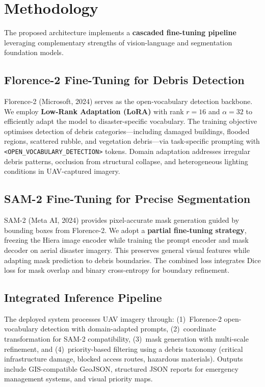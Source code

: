 \documentclass[10pt,a4paper,twocolumn]{article}
\begin{document}
\section{Methodology}

The proposed architecture implements a \textbf{cascaded fine-tuning pipeline}
leveraging complementary strengths of vision-language and segmentation foundation
models.

\subsection{Florence-2 Fine-Tuning for Debris Detection}

Florence-2 (Microsoft, 2024) serves as the open-vocabulary detection backbone.
We employ \textbf{Low-Rank Adaptation (LoRA)} with rank $r{=}16$ and
$\alpha{=}32$ to efficiently adapt the model to disaster-specific vocabulary.
The training objective optimises detection of debris categories---including
damaged buildings, flooded regions, scattered rubble, and vegetation
debris---via task-specific prompting with
\texttt{\small<OPEN\_VOCABULARY\_DETECTION>} tokens.
Domain adaptation addresses irregular debris patterns, occlusion from structural
collapse, and heterogeneous lighting conditions in UAV-captured imagery.

\subsection{SAM-2 Fine-Tuning for Precise Segmentation}

SAM-2 (Meta AI, 2024) provides pixel-accurate mask generation guided by bounding
boxes from Florence-2. We adopt a \textbf{partial fine-tuning strategy}, freezing
the Hiera image encoder while training the prompt encoder and mask decoder on
aerial disaster imagery. This preserves general visual features while adapting
mask prediction to debris boundaries. The combined loss integrates Dice loss for
mask overlap and binary cross-entropy for boundary refinement.

\subsection{Integrated Inference Pipeline}

The deployed system processes UAV imagery through: (1)~Florence-2 open-vocabulary
detection with domain-adapted prompts, (2)~coordinate transformation for SAM-2
compatibility, (3)~mask generation with multi-scale refinement, and (4)~priority-based
filtering using a debris taxonomy (critical infrastructure damage, blocked access
routes, hazardous materials). Outputs include GIS-compatible GeoJSON, structured
JSON reports for emergency management systems, and visual priority maps.
\end{document}
